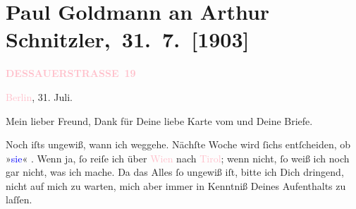 

\renewcommand{\erwaehntePersonen}{Personen: Richard Beer-Hofmann, Paula Beer-Hofmann, Mirjam Beer-Hofmann, Maximilian Harden, Theodore Rottenberg, Olga Schnitzler, Heinrich Schnitzler}
\renewcommand{\erwaehnteOrte}{Orte: Berlin, Dessauer Straße, Schneeberg, Südtirol, Tirol, Welsberg-Taisten, Wien}
\renewcommand{\erwaehnteWerke}{}
\section[ Paul Goldmann an Arthur Schnitzler, 31. 7. {[}1903{]}]{Paul Goldmann an Arthur Schnitzler, 31. 7. {[}1903{]}}
\nopagebreak{}
\rehead{ }\normalsize\beginnumbering{}
\toendnotes[C]{\smallbreak\pagebreak[2]}
\toendnotes[C]{\smallbreak}
\pstart
           \noindent{}\raggedleft{}{\pb}\textcolor{gray}{\textbf{\textcolor{pink}{DESSAUERSTRASSE 19}{}\ledrightnote{\textcolor{pink}{Dessauer Straße}}}}\pend
           
\pstart
           \textcolor{pink}{Berlin}{}\ledrightnote{\textcolor{pink}{Berlin}}, 31. Juli.\pend
           
\pstart\center{}Mein lieber Freund,\pend
\pstart
           Dank für Deine liebe Karte vom \label{K_L03379-2v}\label{K_L03379-2h} und Deine Briefe.\pend
           
\pstart
           Noch iſts ungewiß, wann ich weggehe. Nächſte Woche wird ſichs entſcheiden, ob »\textcolor{blue}{sie}{}\ledrightnote{{$\rightarrow$}\textcolor{blue}{Theodore Rottenberg}}« \label{K_L03379-1v}\label{K_L03379-1h}. Wenn ja, ſo \strikeout{\textcolor{gray}{k}} reiſe ich über \textcolor{pink}{Wien}{}\ledrightnote{\textcolor{pink}{Wien}} nach \textcolor{pink}{Tirol}{}\ledrightnote{\textcolor{pink}{Tirol}{\newline}\textcolor{pink}{Südtirol}}; wenn nicht, ſo weiß ich noch gar nicht, was ich
               mache. Da das Alles ſo ungewiß iſt, bitte ich Dich dringend, nicht auf mich zu
               warten, mich aber immer in Kenntniß Deines Aufenthalts {\pb}zu laſſen.\pend
           
